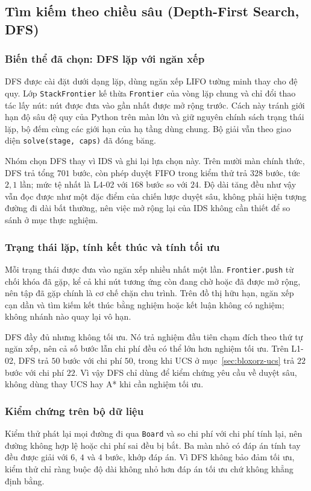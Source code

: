 \subsection{Tìm kiếm theo chiều sâu (Depth-First Search, DFS)}
\label{sec:bloxorz-dfs}

\subsubsection{Biến thể đã chọn: DFS lặp với ngăn xếp}
DFS được cài đặt dưới dạng lặp, dùng ngăn xếp LIFO tường minh thay cho đệ quy.
Lớp \texttt{StackFrontier} kế thừa \texttt{Frontier} của vòng lặp chung và chỉ
đổi thao tác lấy nút: nút được đưa vào gần nhất được mở rộng trước. Cách này
tránh giới hạn độ sâu đệ quy của Python trên màn lớn và giữ nguyên chính sách
trạng thái lặp, bộ đếm cùng các giới hạn của hạ tầng dùng chung. Bộ giải vẫn
theo giao diện \texttt{solve(stage, caps)} đã đóng băng.

Nhóm chọn DFS thay vì IDS và ghi lại lựa chọn này. Trên mười màn chính thức,
DFS trả tổng $701$ bước, còn phép duyệt FIFO trong kiểm thử trả $328$ bước,
tức $2{,}1$ lần; mức tệ nhất là L4-02 với $168$ bước so với $24$. Độ dài tăng
đều như vậy vẫn đọc được như một đặc điểm của chiến lược duyệt sâu, không phải
hiện tượng đường đi dài bất thường, nên việc mở rộng lại của IDS không cần
thiết để so sánh ở mục thực nghiệm.

\subsubsection{Trạng thái lặp, tính kết thúc và tính tối ưu}
Mỗi trạng thái được đưa vào ngăn xếp nhiều nhất một lần. \texttt{Frontier.push}
từ chối khóa đã gặp, kể cả khi nút tương ứng còn đang chờ hoặc đã được mở rộng,
nên tập đã gặp chính là cơ chế chặn chu trình. Trên đồ thị hữu hạn, ngăn xếp
cạn dần và tìm kiếm kết thúc bằng nghiệm hoặc kết luận không có nghiệm; không
nhánh nào quay lại vô hạn.

DFS đầy đủ nhưng không tối ưu. Nó trả nghiệm đầu tiên chạm đích theo thứ tự
ngăn xếp, nên cả số bước lẫn chi phí đều có thể lớn hơn nghiệm tối ưu. Trên
L1-02, DFS trả $50$ bước với chi phí $50$, trong khi UCS ở
mục~\ref{sec:bloxorz-ucs} trả $22$ bước với chi phí $22$. Vì vậy DFS chỉ dùng
để kiểm chứng yêu cầu về duyệt sâu, không dùng thay UCS hay A* khi cần nghiệm
tối ưu.

\subsubsection{Kiểm chứng trên bộ dữ liệu}
Kiểm thử phát lại mọi đường đi qua \texttt{Board} và so chi phí với chi phí
tính lại, nên đường không hợp lệ hoặc chi phí sai đều bị bắt. Ba màn nhỏ có
đáp án tính tay đều được giải với $6$, $4$ và $4$ bước, khớp đáp án. Vì DFS
không bảo đảm tối ưu, kiểm thử chỉ ràng buộc độ dài không nhỏ hơn đáp án tối
ưu chứ không khẳng định bằng.

